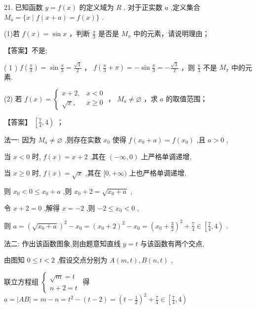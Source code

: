 \documentclass[10pt]{article}
\begin{document}
21. 已知函数 \(y = f\left( x\right)\) 的定义域为 \(R\) . 对于正实数 \(a\) ,定义集合 \({M}_{a} = \{ x \mid  f\left( {x + a}\right)  = f\left( x\right) \}\) .

(1)若 \(f\left( x\right)  = \sin x\) ，判断 \(\frac{\pi }{3}\) 是否是 \({M}_{\pi }\) 中的元素，请说明理由；

【答案】不是;

( 1 ) \(f\left( \frac{\pi }{3}\right)  = \sin \frac{\pi }{3} = \frac{\sqrt{3}}{2}\) ， \(f\left( {\frac{\pi }{3} + \pi }\right)  =  - \sin \frac{\pi }{3} =  - \frac{\sqrt{3}}{2}\) ，则 \(\frac{\pi }{3}\) 不是 \({M}_{\pi }\) 中的元素.

(2) 若 \(f\left( x\right)  = \left\{  \begin{matrix} x + 2, & x < 0 \\  \sqrt{x}, & x \geq  0 \end{matrix}\right.\) ， \({M}_{a} \neq  \varnothing\) ，求 \(a\) 的取值范围；

【答案】 \(\left\lbrack  {\frac{7}{4},4}\right)\) ；

法一: 因为 \({M}_{a} \neq  \varnothing\) ,则存在实数 \({x}_{0}\) 使得 \(f\left( {{x}_{0} + a}\right)  = f\left( {x}_{0}\right)\) ,且 \(a > 0\) ,

当 \(x < 0\) 时, \(f\left( x\right)  = x + 2\) ,其在 \(\left( {-\infty ,0}\right)\) 上严格单调递增,

当 \(x \geq  0\) 时, \(f\left( x\right)  = \sqrt{x}\) ,其在 \(\lbrack 0, + \infty )\) 上也严格单调递增,

则 \({x}_{0} < 0 \leq  {x}_{0} + a\) ,则 \({x}_{0} + 2 = \sqrt{{x}_{0} + a}\) ,

令 \(x + 2 = 0\) ,解得 \(x =  - 2\) ,则 \(- 2 \leq  {x}_{0} < 0\) ,

则 \(a = {\left( \sqrt{{x}_{0} + a}\right) }^{2} - {x}_{0} = {\left( {x}_{0} + 2\right) }^{2} - {x}_{0} = {\left( {x}_{0} + \frac{3}{2}\right) }^{2} + \frac{7}{4} \in  \left\lbrack  {\frac{7}{4},4}\right)\) .

法二: 作出该函数图象,则由题意知直线 \(y = t\) 与该函数有两个交点,

由图知 \(0 \leq  t < 2\) ,假设交点分别为 \(A\left( {m,t}\right) ,B\left( {n,t}\right)\) ,

联立方程组 \(\left\{  \begin{array}{l} \sqrt{m} = t \\  n + 2 = t \end{array}\right.\) 得 \(a = \left| {AB}\right|  = m - n = {t}^{2} - \left( {t - 2}\right)  = {\left( t - \frac{1}{2}\right) }^{2} + \frac{7}{4} \in  \left\lbrack  {\frac{7}{4},4}\right)\)
\end{document}
